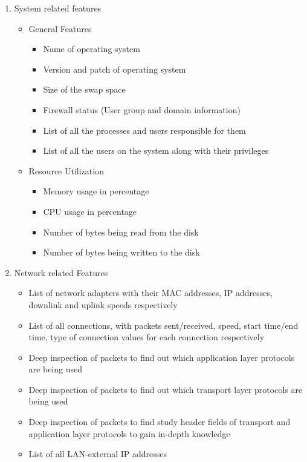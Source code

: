 \documentclass[conference]{sig-alternate-05-2015}
\begin{document}
\begin{itemize}
\begin{enumerate}
  \item System related features
  \begin{itemize}
    \item General Features
      \begin{itemize}
        \item Name of operating system
        \item Version and patch of operating system
        \item Size of the swap space
        \item Firewall status (User group and domain information)
        \item List of all the processes and users responsible for them
        \item List of all the users on the system along with their privileges 
      \end{itemize}
    \item Resource Utilization
      \begin{itemize}
        \item Memory usage in percentage
        \item CPU usage in percentage
        \item Number of bytes being read from the disk
        \item Number of bytes being written to the disk
      \end{itemize}
  \end{itemize}
  \item Network related Features
  \begin{itemize}
    \item List of network adapters with their MAC addresses, IP addresses, downlink and uplink speeds respectively
    \item List of all connections, with packets sent/received, speed, start time/end time, type of connection values for each connection respectively
    \item Deep inspection of packets to find out which application layer protocols are being used
    \item Deep inspection of packets to find out which transport layer protocols are being used
    \item Deep inspection of packets to find study header fields of transport and application layer protocols to gain in-depth knowledge
    \item List of all LAN-external IP addresses
  \end{itemize}

\end{enumerate}
\end{itemize}
\end{document}
